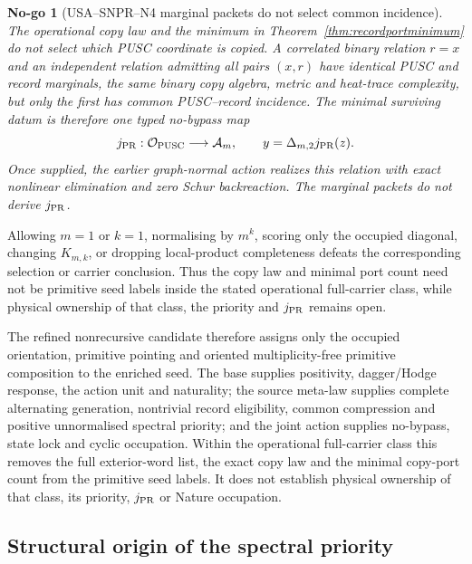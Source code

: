 \documentclass[11pt,a4paper]{article}
\newtheorem{nogo}[definition]{No-go}
\theoremstyle{remark}
\begin{document}
\begin{nogo}[USA--SNPR--N4 marginal packets do not select common incidence]
The operational copy law and the minimum in
Theorem~\ref{thm:recordportminimum} do not select which PUSC coordinate is
copied.  A correlated binary relation $r=x$ and an independent relation
admitting all pairs $(x,r)$ have identical PUSC and record marginals, the same
binary copy algebra, metric and heat-trace complexity, but only the first has
common PUSC--record incidence.  The minimal surviving datum is therefore one
typed no-bypass map
\begin{equation}
 j_{\rm PR}:\mathcal O_{\rm PUSC}\longrightarrow\mathcal A_m,
 \qquad
 y=\Delta_{m,2}j_{\rm PR}(z).
 \label{eq:puscrecordincidence}
\end{equation}
Once supplied, the earlier graph-normal action realizes this relation with
exact nonlinear elimination and zero Schur backreaction.  The marginal
packets do not derive $j_{\rm PR}$.
\label{nogo:puscrecordincidence}
\end{nogo}

Allowing $m=1$ or $k=1$, normalising by $m^k$, scoring only the occupied
diagonal, changing $K_{m,k}$, or dropping local-product completeness defeats
the corresponding selection or carrier conclusion.  Thus the copy law and
minimal port count need not be primitive seed labels inside the stated
operational full-carrier class, while physical ownership of that class, the
priority and $j_{\rm PR}$ remains open.

The refined nonrecursive candidate therefore assigns only the occupied
orientation, primitive pointing and oriented multiplicity-free primitive
composition to the enriched seed.  The base supplies positivity, dagger/Hodge
response, the action unit and naturality; the source meta-law supplies
complete alternating generation, nontrivial record eligibility, common
compression and positive unnormalised spectral priority; and the joint action
supplies no-bypass, state lock and cyclic occupation.  Within the operational
full-carrier class this removes the full exterior-word list, the exact copy
law and the minimal copy-port count from the primitive seed labels.  It does
not establish physical ownership of that class, its priority,
$j_{\rm PR}$ or Nature occupation.

\subsection{Structural origin of the spectral priority}
\end{document}
